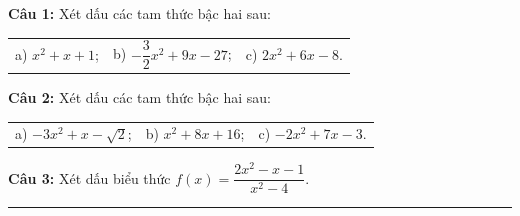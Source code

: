\documentclass[12pt,a4paper]{extarticle}
\begin{document}
\makeheadbox[headerright={Tổng ôn 10-11},chude={CHỦ ĐỀ 04},tieude={Tam thức bậc hai},dinhdang={Đại số},lop={12 },gv={Nguyễn Lê Minh Ngọc}]

\vspace{2em}
\noindent\textbf{Câu 1:} Xét dấu các tam thức bậc hai sau:
\begin{center}
\begin{tabular}{p{5cm} p{5cm} p{5cm}}
a) $x^2 + x + 1$; & b) $-\dfrac{3}{2}x^2 + 9x - 27$; & c) $2x^2 + 6x - 8$.
\end{tabular}
\end{center}
\noindent\textbf{Câu 2:} Xét dấu các tam thức bậc hai sau:
\begin{center}
\begin{tabular}{p{5cm} p{5cm} p{5cm}}
a) $-3x^2 + x - \sqrt{2}$; & b) $x^2 + 8x + 16$; & c) $-2x^2 + 7x - 3$.
\end{tabular}
\end{center}
\noindent\textbf{Câu 3:} Xét dấu biểu thức $f(x) = \dfrac{2x^2 - x - 1}{x^2 - 4}$.
\vspace{0.8cm}
\hrule
\vspace{0.8cm}
\end{document}
